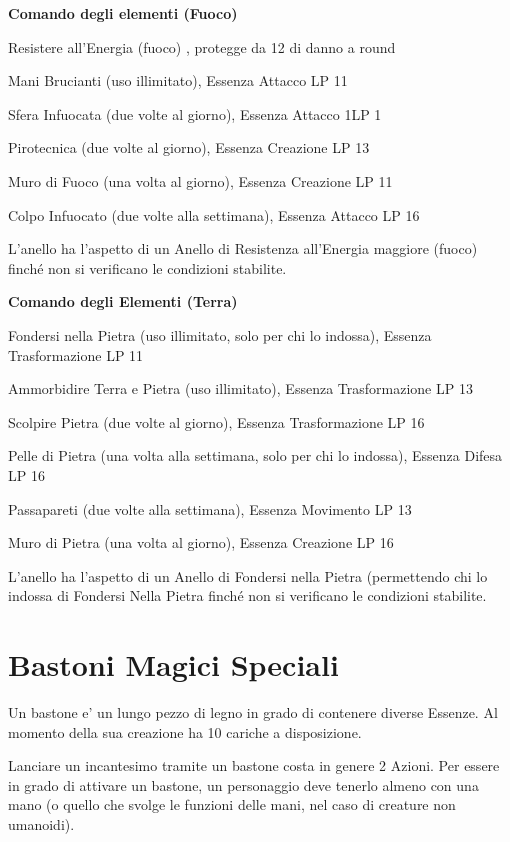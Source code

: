 \documentclass[a4paper,11pt,twoside,openany]{book}
\begin{document}
{		\textbf{Comando degli elementi (Fuoco)}
		
		Resistere all'Energia (fuoco) , protegge da 12 di danno a round
		
		Mani Brucianti (uso illimitato), Essenza Attacco LP 11
		
		Sfera Infuocata (due volte al giorno), Essenza Attacco 1LP 1
		
		Pirotecnica (due volte al giorno), Essenza Creazione LP 13
		
		Muro di Fuoco (una volta al giorno), Essenza Creazione LP 11
		
		Colpo Infuocato (due volte alla settimana), Essenza Attacco LP 16
		
		L'anello ha l'aspetto di un Anello di Resistenza all'Energia maggiore (fuoco) finché non si verificano le condizioni stabilite.
		
		\textbf{Comando degli Elementi (Terra)}
		
		Fondersi nella Pietra (uso illimitato, solo per chi lo indossa), Essenza Trasformazione LP 11
		
		Ammorbidire Terra e Pietra (uso illimitato), Essenza Trasformazione LP 13
		
		Scolpire Pietra (due volte al giorno), Essenza Trasformazione LP 16
		
		Pelle di Pietra (una volta alla settimana, solo per chi lo indossa), Essenza Difesa LP 16
		
		Passapareti (due volte alla settimana), Essenza Movimento LP 13
		
		Muro di Pietra (una volta al giorno), Essenza Creazione LP 16
		
		L'anello ha l'aspetto di un Anello di Fondersi nella Pietra (permettendo chi lo indossa di Fondersi Nella Pietra finché non si verificano le condizioni stabilite.
		
		\pagebreak
		
		\section{Bastoni Magici Speciali}
		
		\label{bastoni-magici-speciali}
		
		Un bastone e' un lungo pezzo di legno in grado di contenere diverse Essenze. Al momento della sua creazione ha 10 cariche a disposizione.
		
		Lanciare un incantesimo tramite un bastone costa in genere 2 Azioni. Per essere in grado di attivare un bastone, un personaggio deve tenerlo almeno con una mano (o quello che svolge le funzioni delle mani, nel caso di creature non umanoidi).
		
}
\end{document}
